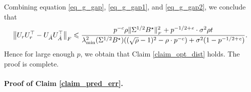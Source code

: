	Combining equation \eqref{eq_g_gap}, \eqref{eq_g_gap1}, and \eqref{eq_g_gap2}, we conclude that
	\begin{align*}
		\left\| U_r U_r^{\top} - U_{\hat{A}} U_{\hat{A}}^{\top} \right\|_{F}
		\leqslant \frac{p^{-c} \rho \|\Sigma^{1/2} B^{\star}\|_{_{F}}^2 + p^{-1/2 + {\mathit{e}}} \cdot \sigma^2 \rho t}{\lambda_{\min}^2(\Sigma^{1/2} B^{\star}) ((\sqrt{\rho} - 1)^2 - \rho \cdot p^{-c}) + \sigma^2 (1 - p^{-1/2 + {\mathit{e}}})}.
	\end{align*}
	Hence for large enough $p$, we obtain that Claim \ref{claim_opt_dist} holds.
	The proof is complete.

	\paragraph{Proof of Claim \ref{claim_pred_err}.}


